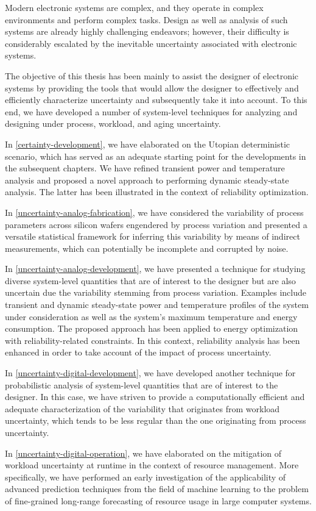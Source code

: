Modern electronic systems are complex, and they operate in complex environments
and perform complex tasks. Design as well as analysis of such systems are
already highly challenging endeavors; however, their difficulty is considerably
escalated by the inevitable uncertainty associated with electronic systems.

The objective of this thesis has been mainly to assist the designer of
electronic systems by providing the tools that would allow the designer to
effectively and efficiently characterize uncertainty and subsequently take it
into account. To this end, we have developed a number of system-level techniques
for analyzing and designing under process, workload, and aging uncertainty.

In \cref{certainty-development}, we have elaborated on the Utopian deterministic
scenario, which has served as an adequate starting point for the developments in
the subsequent chapters. We have refined transient power and temperature
analysis and proposed a novel approach to performing dynamic steady-state
analysis. The latter has been illustrated in the context of reliability
optimization.

In \cref{uncertainty-analog-fabrication}, we have considered the variability of
process parameters across silicon wafers engendered by process variation and
presented a versatile statistical framework for inferring this variability by
means of indirect measurements, which can potentially be incomplete and
corrupted by noise.

In \cref{uncertainty-analog-development}, we have presented a technique for
studying diverse system-level quantities that are of interest to the designer
but are also uncertain due the variability stemming from process variation.
Examples include transient and dynamic steady-state power and temperature
profiles of the system under consideration as well as the system's maximum
temperature and energy consumption. The proposed approach has been applied to
energy optimization with reliability-related constraints. In this context,
reliability analysis has been enhanced in order to take account of the impact of
process uncertainty.

In \cref{uncertainty-digital-development}, we have developed another technique
for probabilistic analysis of system-level quantities that are of interest to
the designer. In this case, we have striven to provide a computationally
efficient and adequate characterization of the variability that originates from
workload uncertainty, which tends to be less regular than the one originating
from process uncertainty.

In \cref{uncertainty-digital-operation}, we have elaborated on the mitigation of
workload uncertainty at runtime in the context of resource management. More
specifically, we have performed an early investigation of the applicability of
advanced prediction techniques from the field of machine learning to the problem
of fine-grained long-range forecasting of resource usage in large computer
systems.
